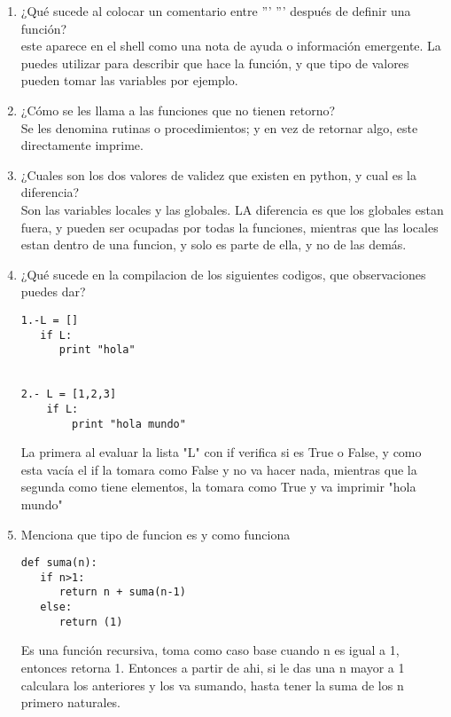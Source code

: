 \documentclass{book}
\begin{document}
\begin{enumerate}%
	\item ¿Qué sucede al colocar un comentario entre ''' ''' después de definir una función? \\
	este aparece en el shell como una nota de ayuda o información emergente. La puedes utilizar para describir que hace la función, y que tipo de valores pueden tomar las variables por ejemplo.
	
	\item ¿Cómo se les llama a las funciones que no tienen retorno?\\
	Se les denomina rutinas o procedimientos; y en vez de retornar algo, este directamente imprime.
	\item ¿Cuales son los dos valores de validez que existen en python, y cual es la diferencia?\\
	Son las variables locales y las globales. LA diferencia es que los globales estan fuera, y pueden ser ocupadas por todas la funciones, mientras que las locales estan dentro de una funcion, y solo es parte de ella, y no de las demás.
	
	\item ¿Qué sucede en la compilacion de los siguientes codigos, que observaciones puedes dar?\\
	\begin{lstlisting}
1.-L = []
   if L:
      print "hola"
	
	
2.- L = [1,2,3]
    if L:
        print "hola mundo" 
	\end{lstlisting}
	La primera al evaluar la lista "L" con if verifica si es True o False, y como esta vacía el if la tomara como False y no va hacer nada, mientras que la segunda como tiene elementos, la tomara como True y va imprimir "hola mundo"
	
	\item Menciona que tipo de funcion es y como funciona \begin{lstlisting}
def suma(n):
   if n>1:
      return n + suma(n-1)
   else:
      return (1)
	\end{lstlisting}
	
	Es una función recursiva, toma como caso base cuando n es igual a 1, entonces retorna 1. Entonces a partir de ahi, si le das una n mayor a 1 calculara los anteriores y los va sumando, hasta tener la suma de los n primero naturales.
	
	
\end{enumerate}%
\end{document}
